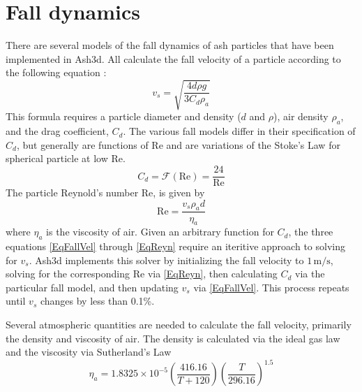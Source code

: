 \chapter{Fall dynamics}\label{ChapAppendFallDynamics}

There are several models of the fall dynamics of ash particles that have
been implemented in Ash3d.  All calculate the fall velocity of a particle
according to the following equation \cite[p.182]{Bird60}:
\begin{equation}
v_s=\sqrt{\frac{4d\rho g}{3C_d\rho_a}}\label{EqFallVel}
\end{equation}
This formula requires a particle diameter and density ($d$ and $\rho$),
air density $\rho_a$, and the drag coefficient, $C_d$.
The various fall models differ in their
specification of $C_d$, but generally are functions of $\mathrm{Re}$
and are variations of the Stoke's Law
for spherical particle at low $\mathrm{Re}$.
\begin{equation}
C_d = \mathcal{F}(\mathrm{Re}) = \frac{24}{\mathrm{Re}}\label{EqCdStokes}
\end{equation}
The particle Reynold's number $\mathrm{Re}$, is given by 
\begin{equation}
\mathrm{Re}=\frac{v_s\rho_a d}{\eta_a}\label{EqReyn}
\end{equation}
where $\eta_a$ is the viscosity of air.  Given an arbitrary function
for $C_d$, the three equations \ref{EqFallVel} through \ref{EqReyn}
require an iteritive approach to solving for $v_s$.  Ash3d implements
this solver by initializing the fall velocity to $1 \, \mathrm{m/s}$,
solving for the corresponding $\mathrm{Re}$ via \ref{EqReyn}, then
calculating $C_d$ via the particular fall model, and then updating
$v_s$ via \ref {EqFallVel}.  This process repeats until $v_s$ changes
by less than 0.1\%.

Several atmospheric quantities are needed to calculate the fall velocity,
primarily the density and viscosity of air.
The density is calculated via the ideal gas law and the viscosity via
Sutherland's Law \cite[p.102, Eq.4.54]{Jacobson05}
\begin{equation}
\eta_a= 1.8325 \times 10^{-5} \left( \frac{416.16}{T+120}\right) 
\left( \frac{T}{296.16}\right)^{1.5}
\end{equation}


